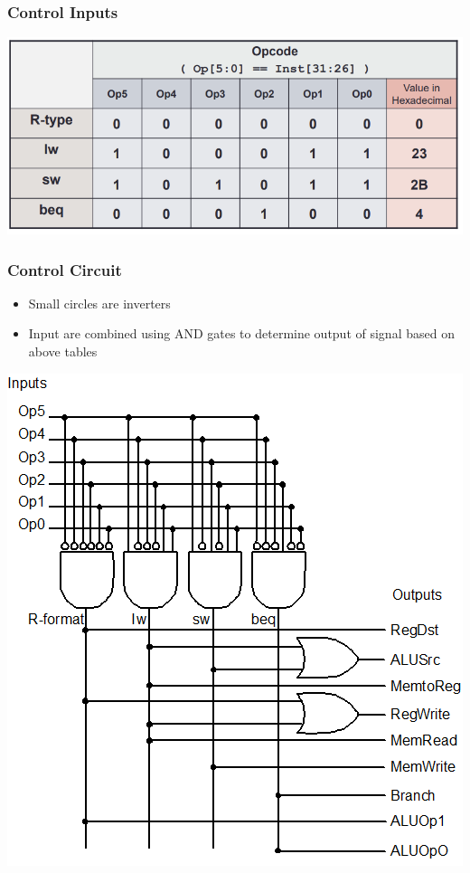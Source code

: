 \documentclass[10pt, portrait]{article}
\begin{document}
\begin{multicols*}{2}
\subsubsection{Control Inputs}
\begin{center}
    \includegraphics[width=\linewidth]{control inputs.png}
\end{center}

\subsubsection{Control Circuit}
\begin{itemize}
    \item Small circles are inverters
    \item Input are combined using AND gates to determine output of signal based on above tables
\end{itemize}
\begin{center}
    \includegraphics[width=0.7\linewidth]{control circuit.png}
\end{center}


\end{multicols*}
\end{document}
